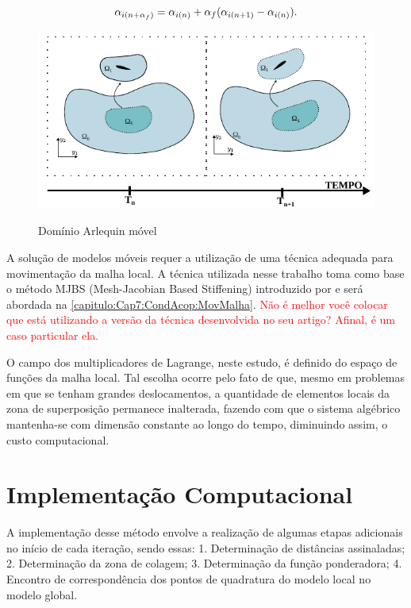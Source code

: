 \begin{align}
	\alpha_{i(n+\alpha_f)} = \alpha_{i(n)} + \alpha_f(\alpha_{i(n+1)} - \alpha_{i(n)}).
\end{align}

\begin{figure}[!htbp]
	\caption{Domínio Arlequin móvel}
	\centering 
	{\includegraphics[scale=1.5,trim=0cm 0cm 0cm 0cm, clip=true]{Imagens/Cap6/dominioArlequinMovel.pdf}}	
	\label{fig:dominioArlequinMovel}
\end{figure}

A solução de modelos móveis requer a utilização de uma técnica adequada para movimentação da malha local. A técnica utilizada nesse trabalho toma como base o método MJBS (Mesh-Jacobian Based Stiffening) introduzido por  e será abordada na  \autoref{capitulo:Cap7:CondAcop:MovMalha}. \textcolor{red}{Não é melhor você colocar que está utilizando a versão da técnica desenvolvida no seu artigo? Afinal, é um caso particular ela.}

O campo dos multiplicadores de Lagrange, neste estudo, é definido do espaço de funções da malha local. Tal escolha ocorre pelo fato de que, mesmo em problemas em que se tenham grandes deslocamentos, a quantidade de elementos locais da zona de superposição permanece inalterada, fazendo com que o sistema algébrico mantenha-se com dimensão constante ao longo do tempo, diminuindo assim, o custo computacional. 

\section{Implementação Computacional}

A implementação desse método envolve a realização de algumas etapas adicionais no início de cada iteração, sendo essas: 1. Determinação de distâncias assinaladas; 2. Determinação da zona de colagem;  3. Determinação da função ponderadora; 4. Encontro de correspondência dos pontos de quadratura do modelo local no modelo global.

